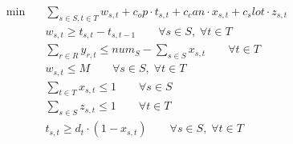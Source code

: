 \begin{align}
  \min\quad & \sum_{s \in S, t \in T} w_{s,t} + c_op \cdot t_{s,t} + c_can \cdot x_{s,t} + c_slot \cdot z_{s,t} \tag{total\_cost} \\
  & w_{s,t} \ge t_{s,t} - t_{s,t-1} \qquad \forall s \in S,\; \forall t \in T \tag{service\_continuity} \\
  & \sum_{r \in R} y_{r,t} \le num_S - \sum_{s \in S} x_{s,t} \qquad \forall t \in T \tag{fleet\_feasibility} \\
  & w_{s,t} \le M \qquad \forall s \in S,\; \forall t \in T \tag{delay\_limit} \\
  & \sum_{t \in T} x_{s,t} \le 1 \qquad \forall s \in S \tag{cancellation\_limit} \\
  & \sum_{s \in S} z_{s,t} \le 1 \qquad \forall t \in T \tag{slot\_limit} \\
  & t_{s,t} \ge d_t \cdot (1 - x_{s,t}) \qquad \forall s \in S,\; \forall t \in T \tag{disruption\_duration} \\
\end{align}